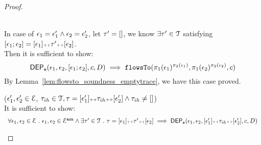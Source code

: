 \begin{proof}
\begin{case}
      \\
      In case of $\mathtt{\epsilon}_1 = \mathtt{\epsilon}_1' \land  \mathtt{\epsilon}_2 = \mathtt{\epsilon}_2'$,
      let $\mathtt{\tau}' = []$, we know $\exists \mathtt{\tau}' \in \mathcal{T}$ satisfying 
      $[\mathtt{\epsilon}_1; \mathtt{\epsilon}_2] = [\mathtt{\epsilon}_1] {\scriptscriptstyle ++} \mathtt{\tau}' {\scriptscriptstyle ++} [\mathtt{\epsilon}_2]$.
      \\
      Then it is sufficient to show: 
      \[
        \mathsf{DEP_{\mathtt{e}}}(\mathtt{\epsilon}_1, \mathtt{\epsilon}_2, [\mathtt{\epsilon}_1; \mathtt{\epsilon}_2], c, D) 
        \implies \mathtt{flowsTo}(\pi_1(\mathtt{\epsilon}_1)^{\pi_2(\mathtt{\epsilon}_1)}, \pi_1(\mathtt{\epsilon}_2)^{\pi_2(\mathtt{\epsilon}_2)}, c)
      \]
     By Lemma~\ref{lem:flowsto_soundness_emptytrace}, we have this case proved.
      \end{case}
        \begin{case}
        ($\mathtt{\epsilon}_1', \mathtt{\epsilon}_2' \in \mathcal{E}$, $\mathtt{\tau}_{ih} \in \mathcal{T}, \mathtt{\tau} = [\mathtt{\epsilon}_1'] {\scriptscriptstyle ++} \mathtt{\tau}_{ih} {\scriptscriptstyle ++} [\mathtt{\epsilon}_2'] \land \mathtt{\tau}_{ih} \neq {[]}$)
        \\
        It is sufficient to show:
        \[    \begin{array}{l}
         \forall \mathtt{\epsilon}_1, \mathtt{\epsilon}_2 \in \mathcal{E} ~.~
          \mathtt{\epsilon}_1, \mathtt{\epsilon}_2 \in \mathcal{E}^{\mathtt{{asn}}} \land 
           \exists \mathtt{\tau}' \in \mathcal{T} ~.~ \mathtt{\tau} = [\mathtt{\epsilon}_1] {\scriptscriptstyle ++} \mathtt{\tau}' {\scriptscriptstyle ++} [\mathtt{\epsilon}_2]
          \implies
          \mathsf{DEP_{\mathtt{e}}}(\mathtt{\epsilon}_1, \mathtt{\epsilon}_2, [\mathtt{\epsilon}_1'] {\scriptscriptstyle ++} \mathtt{\tau}_{ih} {\scriptscriptstyle ++} [\mathtt{\epsilon}_2'], c, D) 

\end{array}\]
\end{case}
\end{proof}
